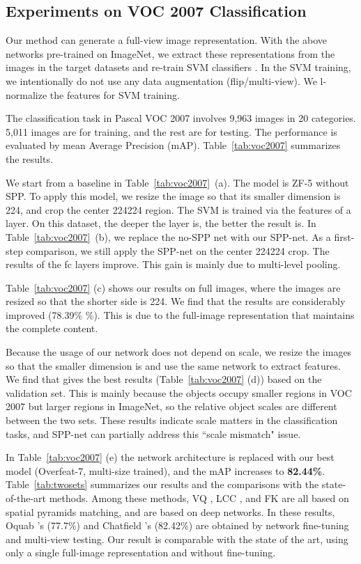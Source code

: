 \documentclass[10pt,journal,cspaper,compsoc]{IEEEtran}
\begin{document}
\subsection{Experiments on VOC 2007 Classification}

Our method can generate a full-view image representation.
With the above networks pre-trained on ImageNet, we extract these representations from the images in the target datasets and re-train SVM classifiers \cite{Chang2011}. In the SVM training, we intentionally do not use any data augmentation (flip/multi-view). We l-normalize the features for SVM training.

The classification task in Pascal VOC 2007 \cite{Everingham2007} involves 9,963 images in 20 categories. 5,011 images are for training, and the rest are for testing. The performance is evaluated by mean Average Precision (mAP). Table~\ref{tab:voc2007} summarizes the results.

We start from a baseline in Table~\ref{tab:voc2007}~(a). The model is ZF-5 without SPP. To apply this model, we resize the image so that its smaller dimension is 224, and crop the center 224224 region.
The SVM is trained via the features of a layer. On this dataset, the deeper the layer is, the better the result is. In Table~\ref{tab:voc2007}~(b), we replace the no-SPP net with our SPP-net. As a first-step comparison, we still apply the SPP-net on the center 224224 crop. The results of the fc layers improve. This gain is mainly due to multi-level pooling.

Table~\ref{tab:voc2007} (c) shows our results on full images, where the images are resized so that the shorter side is 224. We find that the results are considerably improved (78.39\% \%). This is due to the full-image representation that maintains the complete content.

Because the usage of our network does not depend on scale, we resize the images so that the smaller dimension is  and use the same network to extract features. We find that  gives the best results (Table~\ref{tab:voc2007} (d)) based on the validation set.
This is mainly because the objects occupy smaller regions in VOC 2007 but larger regions in ImageNet, so the relative object scales are different between the two sets. These results indicate scale matters in the classification tasks, and SPP-net can partially address this ``scale mismatch" issue.

In Table~\ref{tab:voc2007} (e) the network architecture is replaced with our best model (Overfeat-7, multi-size trained), and the mAP increases to \textbf{82.44\%}.
Table~\ref{tab:twosets} summarizes our results and the comparisons with the state-of-the-art methods. Among these methods, VQ \cite{Lazebnik2006}, LCC \cite{Wang2010}, and FK \cite{Perronnin2010} are all based on spatial pyramids matching, and \cite{Donahue2013,Zeiler2013,Oquab2014,Chatfield2014} are based on deep networks. In these results, Oquab \etal's (77.7\%) and Chatfield \etal's (82.42\%) are obtained by network fine-tuning and multi-view testing. Our result is comparable with the state of the art, using only a single full-image representation and without fine-tuning.
\end{document}
